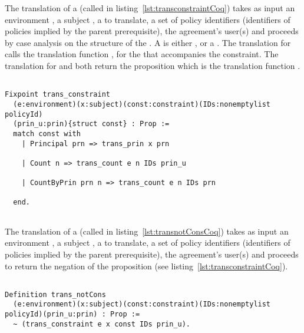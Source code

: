The translation of a  (called  in listing~\ref{lst:transconstraintCoq}) takes as input 
an environment , a subject , a   to translate, a set of policy identifiers  (identifiers of policies implied by the parent prerequisite), the agreement's user(s)  and proceeds by case analysis on the structure of the . A  is either ,  or a . The translation for  calls the translation function , for the  that accompanies the  constraint. The translation for  and  both return the proposition which is the translation function . 


\begin{minipage}[c]{0.95\textwidth}
\begin{lstlisting}

Fixpoint trans_constraint 
  (e:environment)(x:subject)(const:constraint)(IDs:nonemptylist policyId)
  (prin_u:prin){struct const} : Prop := 
  match const with
    | Principal prn => trans_prin x prn
  
    | Count n => trans_count e n IDs prin_u

    | CountByPrin prn n => trans_count e n IDs prn 

  end.
  
\end{lstlisting}
\end{minipage}

The translation of a  (called  in listing~\ref{lst:transnotConsCoq}) takes as input 
an environment , a subject , a   to translate, a set of policy identifiers  (identifiers of policies implied by the parent prerequisite), the agreement's user(s)  and proceeds to return the negation of the proposition  (see listing~\ref{lst:transconstraintCoq}).

\begin{lstlisting}

Definition trans_notCons
  (e:environment)(x:subject)(const:constraint)(IDs:nonemptylist policyId)(prin_u:prin) : Prop :=
  ~ (trans_constraint e x const IDs prin_u).
\end{lstlisting}


